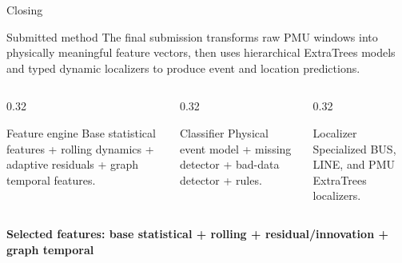 ﻿\documentclass[10pt,aspectratio=169]{beamer}
\begin{document}
\begin{frame}{Closing}
\small
\begin{block}{Submitted method}
The final submission transforms raw PMU windows into physically meaningful feature vectors, then uses hierarchical ExtraTrees models and typed dynamic localizers to produce event and location predictions.
\end{block}
\begin{columns}[T,totalwidth=\textwidth]
\begin{column}{0.32\textwidth}
\begin{exampleblock}{Feature engine}
Base statistical features + rolling dynamics + adaptive residuals + graph temporal features.
\end{exampleblock}
\end{column}
\begin{column}{0.32\textwidth}
\begin{exampleblock}{Classifier}
Physical event model + missing detector + bad-data detector + rules.
\end{exampleblock}
\end{column}
\begin{column}{0.32\textwidth}
\begin{exampleblock}{Localizer}
Specialized BUS, LINE, and PMU ExtraTrees localizers.
\end{exampleblock}
\end{column}
\end{columns}
\vspace{3mm}
\centering
{\Large\bfseries Selected features: base statistical + rolling + residual/innovation + graph temporal}
\end{frame}
\end{document}
